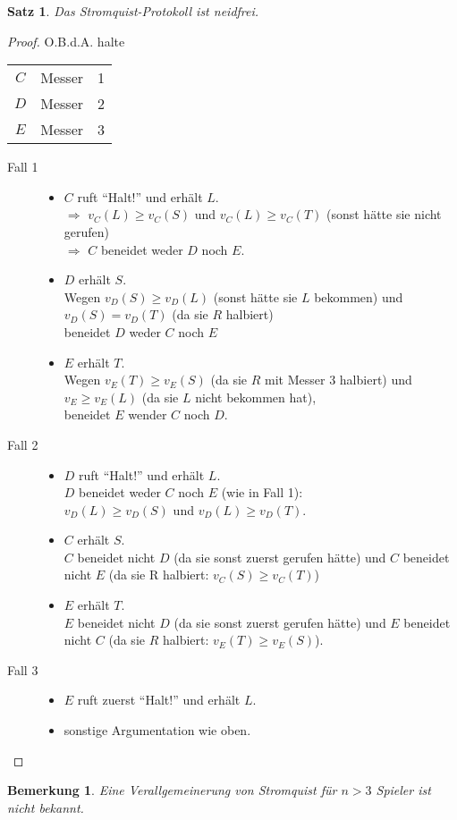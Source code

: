 \documentclass[a4paper,10pt]{scrartcl}
\newtheorem*{bemerkung*}{Bemerkung}
\newtheorem*{satz*}{Satz}
\begin{document}
\begin{satz*}
 Das Stromquist-Protokoll ist neidfrei.
\end{satz*}
\begin{proof}
 O.B.d.A. halte\begin{tabular}{ccc}$C$&Messer&1\\$D$&Messer&2\\$E$&Messer&3\end{tabular}
 \begin{description}
  \item[Fall 1] \begin{itemize}
                 \item $C$ ruft ``Halt!'' und erhält $L$.\\$\Rightarrow$ $v_C(L)\geq v_C(S)$ und $v_C(L)\geq v_C(T)$
                       (sonst hätte sie nicht gerufen)\\$\Rightarrow$ $C$ beneidet weder $D$ noch $E$. 
                 \item $D$ erhält $S$.\\Wegen $v_D(S)\geq v_D(L)$ (sonst hätte sie $L$ bekommen) und $v_D(S)=v_D(T)$ (da sie $R$ halbiert)\\
                       beneidet $D$ weder $C$ noch $E$
                 \item $E$ erhält $T$.\\Wegen $v_E(T)\geq v_E(S)$ (da sie $R$ mit Messer 3 halbiert) und $v_E\geq v_E(L)$ (da sie $L$ nicht
                       bekommen hat),\\ beneidet $E$ wender $C$ noch $D$.
                \end{itemize}
  \item[Fall 2] \begin{itemize}
                 \item $D$ ruft ``Halt!'' und erhält $L$.\\$D$ beneidet weder $C$ noch $E$ (wie in Fall 1):\\
                       $v_D(L)\geq v_D(S)$ und $v_D(L)\geq v_D(T)$.
                 \item $C$ erhält $S$.\\$C$ beneidet nicht $D$ (da sie sonst zuerst gerufen hätte) und
                       $C$ beneidet nicht $E$ (da sie R halbiert: $v_C(S)\geq v_C(T)$)
                 \item $E$ erhält $T$.\\$E$ beneidet nicht $D$ (da sie sonst zuerst gerufen hätte) und $E$ beneidet nicht $C$ (da sie $R$
                       halbiert: $v_E(T)\geq v_E(S)$).
                \end{itemize}
  \item[Fall 3] \begin{itemize}
                 \item $E$ ruft zuerst ``Halt!'' und erhält $L$.
                 \item sonstige Argumentation wie oben.
                \end{itemize}
 \end{description}
\end{proof}
\begin{bemerkung*}
 Eine Verallgemeinerung von Stromquist für $n>3$ Spieler ist nicht bekannt.
\end{bemerkung*}
\end{document}
